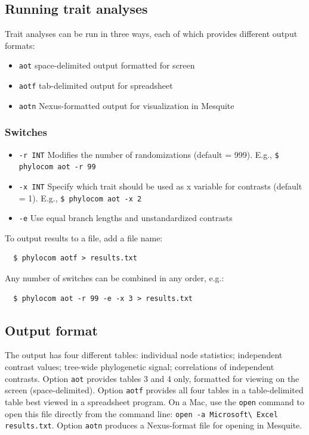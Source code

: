 \documentclass[12pt,letterpaper]{article}
\begin{document}
\subsection{Running trait analyses}

Trait analyses can be run in three ways, each of which provides
different output formats:

\begin{itemize}
\item[] \texttt{aot} space-delimited output formatted for screen
\item[] \texttt{aotf} tab-delimited output for spreadsheet
\item[] \texttt{aotn} Nexus-formatted output for visualization in Mesquite
\end{itemize}

\subsubsection{Switches}
\label{aotswitch}

\begin{itemize} \raggedright
\item[] \texttt{-r INT} Modifies the number of randomizations (default
  = 999). E.g., \verb|$ phylocom aot -r 99|
\item[] \texttt{-x INT} Specify which trait should be used as x
  variable for contrasts (default = 1). E.g., \verb|$ phylocom aot -x 2|
\item[] \texttt{-e} Use equal branch lengths and unstandardized contrasts
\end{itemize}

To output results to a file, add a file name:
\begin{verbatim}
  $ phylocom aotf > results.txt
\end{verbatim}

Any number of switches can be combined in any order, e.g.:
\begin{verbatim}
  $ phylocom aot -r 99 -e -x 3 > results.txt
\end{verbatim}

\subsection{Output format}

The output has four different tables: individual node statistics;
independent contrast values; tree-wide phylogenetic signal;
correlations of independent contrasts. Option \verb|aot| provides
tables 3 and 4 only, formatted for viewing on the screen
(space-delimited). Option \verb|aotf| provides all four tables in a
table-delimited table best viewed in a spreadsheet program. On a Mac,
use the \verb|open| command to open this file directly from the command line:
\verb|open -a Microsoft\ Excel results.txt|. Option \verb|aotn| produces a
Nexus-format file for opening in Mesquite.
\end{document}
